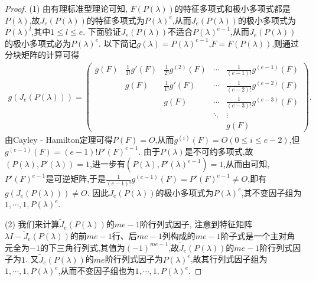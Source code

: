 \documentclass[../../main.tex]{subfiles}%
\begin{document}
\begin{proof}
(1) 由有理标准型理论可知, $F(P(\lambda))$的特征多项式和极小多项式都是$P(\lambda)$,故$J_e(P(\lambda))$的特征多项式为$P(\lambda)^e$,从而$J_e(P(\lambda))$的极小多项式为$P(\lambda)^l$,其中$1\leqslant l\leqslant e$. 下面验证$J_e(P(\lambda))$不适合$P(\lambda)^{e - 1}$,从而$J_e(P(\lambda))$的极小多项式必为$P(\lambda)^e$. 以下简记$g(\lambda)=P(\lambda)^{e - 1}$,$F = F(P(\lambda))$,则通过分块矩阵的计算可得
\begin{align*}
g(J_e(P(\lambda))) = 
\begin{pmatrix}
g(F) & \frac{1}{1!}g'(F) & \frac{1}{2!}g^{(2)}(F) & \cdots & \frac{1}{(e - 1)!}g^{(e - 1)}(F) \\
 & g(F) & \frac{1}{1!}g'(F) & \cdots & \frac{1}{(e - 2)!}g^{(e - 2)}(F) \\
 & & g(F) & \cdots & \frac{1}{(e - 3)!}g^{(e - 3)}(F) \\
 & & & \ddots & \vdots \\
 & & & & g(F)
\end{pmatrix}.
\end{align*}
由Cayley - Hamilton定理可得$P(F)=O$,从而$g^{(i)}(F)=O (0\leqslant i\leqslant e - 2)$,但$g^{(e - 1)}(F)=(e - 1)!P'(F)^{e - 1}$. 由于$P(\lambda)$是不可约多项式,故$(P(\lambda),P'(\lambda)) = 1$,进一步有$(P(\lambda),P'(\lambda)^{e - 1}) = 1$,从而由可知,$P'(F)^{e - 1}$是可逆矩阵,于是$\frac{1}{(e - 1)!}g^{(e - 1)}(F)=P'(F)^{e - 1}\neq O$,即有$g(J_e(P(\lambda)))\neq O$. 因此$J_e(P(\lambda))$的极小多项式为$P(\lambda)^e$,其不变因子组为$1,\cdots,1,P(\lambda)^e$.

(2) 我们来计算$\widetilde{J}_e(P(\lambda))$的$me - 1$阶行列式因子, 注意到特征矩阵$\lambda I-\widetilde{J}_e(P(\lambda))$的前$me - 1$行、后$me - 1$列构成的$me - 1$阶子式是一个主对角元全为$-1$的下三角行列式,其值为$(-1)^{me - 1}$,故$\widetilde{J}_e(P(\lambda))$的$me - 1$阶行列式因子为$1$. 又$\widetilde{J}_e(P(\lambda))$的$me$阶行列式因子为$P(\lambda)^e$,故其行列式因子组为$1,\cdots,1,P(\lambda)^e$,从而不变因子组也为$1,\cdots,1,P(\lambda)^e$.
\end{proof}
\end{document}
